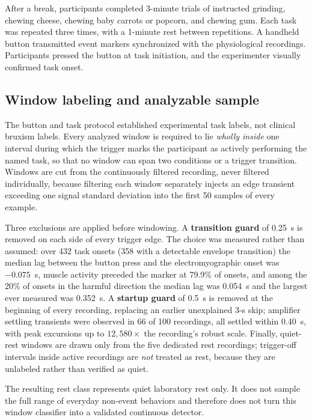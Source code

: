 \documentclass[pdflatex,sn-nature,iicol]{sn-jnl}
\begin{document}
After a break, participants completed 3-minute trials of instructed grinding, chewing cheese, chewing baby carrots or popcorn, and chewing gum. Each task was repeated three times, with a 1-minute rest between repetitions. A handheld button transmitted event markers synchronized with the physiological recordings. Participants pressed the button at task initiation, and the experimenter visually confirmed task onset.

\subsection{Window labeling and analyzable sample}

The button and task protocol established experimental task labels, not clinical bruxism labels. Every analyzed window is required to lie \emph{wholly inside} one interval during which the trigger marks the participant as actively performing the named task, so that no window can span two conditions or a trigger transition. Windows are cut from the continuously filtered recording, never filtered individually, because filtering each window separately injects an edge transient exceeding one signal standard deviation into the first 50 samples of every example.

Three exclusions are applied before windowing. A \textbf{transition guard} of 0.25~s is removed on each side of every trigger edge. The choice was measured rather than assumed: over 432 task onsets (358 with a detectable envelope transition) the median lag between the button press and the electromyographic onset was $-0.075$~s, muscle activity preceded the marker at 79.9\% of onsets, and among the 20\% of onsets in the harmful direction the median lag was 0.054~s and the largest ever measured was 0.352~s. A \textbf{startup guard} of 0.5~s is removed at the beginning of every recording, replacing an earlier unexplained 3-s skip; amplifier settling transients were observed in 66 of 100 recordings, all settled within 0.40~s, with peak excursions up to $12{,}580\times$ the recording's robust scale. Finally, quiet-rest windows are drawn only from the five dedicated rest recordings; trigger-off intervals inside active recordings are \emph{not} treated as rest, because they are unlabeled rather than verified as quiet.

The resulting rest class represents quiet laboratory rest only. It does not sample the full range of everyday non-event behaviors and therefore does not turn this window classifier into a validated continuous detector.
\end{document}
